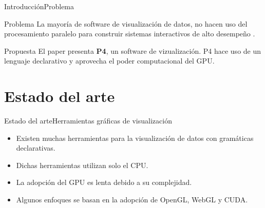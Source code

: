 \documentclass[10pt]{beamer}
\newcommand{\1}{
	\setbeamertemplate{background}{
		\texttt{[image: img/1]}
		\tikz[overlay] \fill[fill opacity=0.75,fill=white] (0,0) rectangle (-\paperwidth,\paperheight);
	}
}
\begin{document}
\begin{frame}{Introducción}{Problema}	
\begin{block}{Problema}
	La mayoría de software de visualización de datos, no hacen uso del procesamiento paralelo para construir sistemas interactivos de alto desempeño \cite{li2018p4}.		
\end{block}
\pause
\begin{block}{Propuesta}
	El paper presenta \textbf{P4}, un software de vizualización. P4 hace uso de un lenguaje declarativo y aprovecha el poder computacional del GPU.		
\end{block}	
\end{frame}

\section{Estado del arte}

\begin{frame}{Estado del arte}{Herramientas gráficas de visualización}	
\begin{itemize}
	\item Existen muchas herramientas para la visualización de datos con gramáticas declarativas. \pause
	\item Dichas herramientas utilizan solo el CPU. \pause
	\item La adopción del GPU es lenta debido a su complejidad. \pause
	\item Algunos enfoques se basan en la adopción de OpenGL, WebGL y CUDA.
\end{itemize}
\end{frame}
\end{document}
